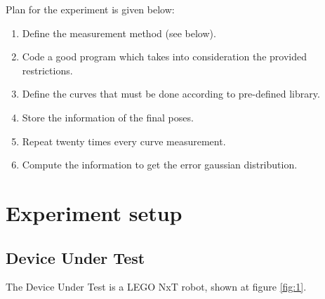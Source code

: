 \documentclass[10pt]{scrartcl}
\begin{document}
Plan for the experiment is given below:

\begin{enumerate}
	\item Define the measurement method (see below).
	\item Code a good program which takes into consideration the provided restrictions.
	\item Define the curves that must be done according to pre-defined library.
	\item Store the information of the final poses.
	\item Repeat twenty times every curve measurement.
	\item Compute the information to get the error gaussian distribution.
\end{enumerate}
\section*{Experiment setup}

\subsection*{Device Under Test}

The Device Under Test is a LEGO NxT robot, shown at figure \ref{fig:1}.
\end{document}
